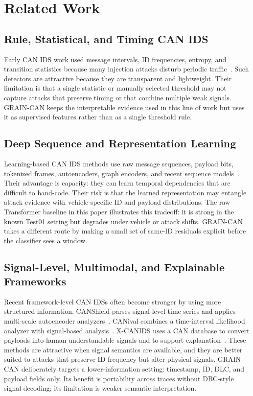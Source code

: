 \documentclass[runningheads]{llncs}
\newcommand{\method}{GRAIN-CAN}
\begin{document}
\section{Related Work}
\subsection{Rule, Statistical, and Timing CAN IDS}
Early CAN IDS work used message intervals, ID frequencies, entropy, and transition statistics because many injection attacks disturb periodic traffic~\cite{song2016intrusion,taylor2016frequency,blevins2021time}. Such detectors are attractive because they are transparent and lightweight. Their limitation is that a single statistic or manually selected threshold may not capture attacks that preserve timing or that combine multiple weak signals. \method{} keeps the interpretable evidence used in this line of work but uses it as supervised features rather than as a single threshold rule.

\subsection{Deep Sequence and Representation Learning}
Learning-based CAN IDS methods use raw message sequences, payload bits, tokenized frames, autoencoders, graph encoders, and recent sequence models~\cite{canet2019,alkhatib2022canbert,wang2023statgraph,liu2026mids}. Their advantage is capacity: they can learn temporal dependencies that are difficult to hand-code. Their risk is that the learned representation may entangle attack evidence with vehicle-specific ID and payload distributions. The raw Transformer baseline in this paper illustrates this tradeoff: it is strong in the known Test01 setting but degrades under vehicle or attack shifts. \method{} takes a different route by making a small set of same-ID residuals explicit before the classifier sees a window.

\subsection{Signal-Level, Multimodal, and Explainable Frameworks}
Recent framework-level CAN IDSs often become stronger by using more structured information. CANShield parses signal-level time series and applies multi-scale autoencoder analyzers~\cite{shahriar2022canshield}. CANival combines a time-interval likelihood analyzer with signal-based analysis~\cite{kang2024canival}. X-CANIDS uses a CAN database to convert payloads into human-understandable signals and to support explanation~\cite{jeong2023xcanids}. These methods are attractive when signal semantics are available, and they are better suited to attacks that preserve ID frequency but alter physical signals. \method{} deliberately targets a lower-information setting: timestamp, ID, DLC, and payload fields only. Its benefit is portability across traces without DBC-style signal decoding; its limitation is weaker semantic interpretation.
\end{document}
